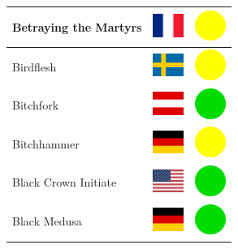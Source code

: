 \documentclass[12pt, a4paper, twoside]{report}
\begin{document}
\begin{center}
\begin{longtable}{|p{5cm}|p{2cm}|p{2cm}|}
 Betraying the Martyrs                                      & \includegraphics[width=1cm]{4x3/fr} &   \includegraphics[width=1cm]{likes/m} \\ \hline
 Birdflesh                                                  & \includegraphics[width=1cm]{4x3/se} &   \includegraphics[width=1cm]{likes/m} \\ \hline
 Bitchfork                                                  & \includegraphics[width=1cm]{4x3/at} &   \includegraphics[width=1cm]{likes/y} \\ \hline
 Bitchhammer                                                & \includegraphics[width=1cm]{4x3/de} &   \includegraphics[width=1cm]{likes/m} \\ \hline
 Black Crown Initiate                                       & \includegraphics[width=1cm]{4x3/us} &   \includegraphics[width=1cm]{likes/y} \\ \hline
 Black Medusa                                               & \includegraphics[width=1cm]{4x3/de} &   \includegraphics[width=1cm]{likes/y} \\ \hline

\end{longtable}
\end{center}
\end{document}
